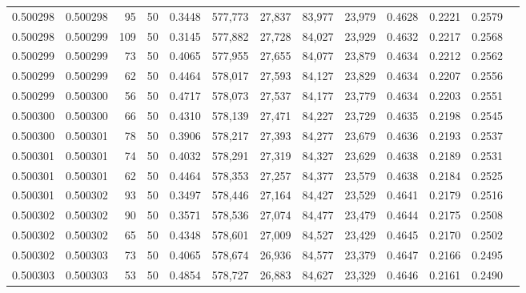 \begin{tabular}{rrrrrrrrrrrrr}
0.500298 & 0.500298 &    95 &  50 &                                     0.3448 & 577,773 &  27,837 &  83,977 &  23,979 & 0.4628 & 0.2221 & 0.2579 \\
0.500298 & 0.500299 &   109 &  50 &                                     0.3145 & 577,882 &  27,728 &  84,027 &  23,929 & 0.4632 & 0.2217 & 0.2568 \\
0.500299 & 0.500299 &    73 &  50 &                                     0.4065 & 577,955 &  27,655 &  84,077 &  23,879 & 0.4634 & 0.2212 & 0.2562 \\
0.500299 & 0.500299 &    62 &  50 &                                     0.4464 & 578,017 &  27,593 &  84,127 &  23,829 & 0.4634 & 0.2207 & 0.2556 \\
0.500299 & 0.500300 &    56 &  50 &                                     0.4717 & 578,073 &  27,537 &  84,177 &  23,779 & 0.4634 & 0.2203 & 0.2551 \\
0.500300 & 0.500300 &    66 &  50 &                                     0.4310 & 578,139 &  27,471 &  84,227 &  23,729 & 0.4635 & 0.2198 & 0.2545 \\
0.500300 & 0.500301 &    78 &  50 &                                     0.3906 & 578,217 &  27,393 &  84,277 &  23,679 & 0.4636 & 0.2193 & 0.2537 \\
0.500301 & 0.500301 &    74 &  50 &                                     0.4032 & 578,291 &  27,319 &  84,327 &  23,629 & 0.4638 & 0.2189 & 0.2531 \\
0.500301 & 0.500301 &    62 &  50 &                                     0.4464 & 578,353 &  27,257 &  84,377 &  23,579 & 0.4638 & 0.2184 & 0.2525 \\
0.500301 & 0.500302 &    93 &  50 &                                     0.3497 & 578,446 &  27,164 &  84,427 &  23,529 & 0.4641 & 0.2179 & 0.2516 \\
0.500302 & 0.500302 &    90 &  50 &                                     0.3571 & 578,536 &  27,074 &  84,477 &  23,479 & 0.4644 & 0.2175 & 0.2508 \\
0.500302 & 0.500302 &    65 &  50 &                                     0.4348 & 578,601 &  27,009 &  84,527 &  23,429 & 0.4645 & 0.2170 & 0.2502 \\
0.500302 & 0.500303 &    73 &  50 &                                     0.4065 & 578,674 &  26,936 &  84,577 &  23,379 & 0.4647 & 0.2166 & 0.2495 \\
0.500303 & 0.500303 &    53 &  50 &                                     0.4854 & 578,727 &  26,883 &  84,627 &  23,329 & 0.4646 & 0.2161 & 0.2490 \\

\end{tabular}
